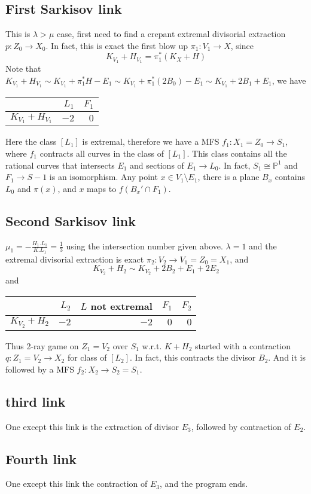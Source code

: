 \documentclass{article}
\begin{document}
\subsection{First Sarkisov link}
This is $ \lambda > \mu $ case, first need to find a crepant extremal divisorial extraction $ p:Z_0\to X_0 $. In fact, this is exact the first blow up $ \pi_1:V_1\to X $, since
\[ K_{V_1}+H_{V_1}=\pi_1^*(K_X+H) \]
Note that $  K_{V_1}+H_{V_1}\sim K_{V_1}+\pi_1^*H-E_1\sim K_{V_1}+\pi_1^*(2B_0)-E_1\sim K_{V_1}+2B_1+E_1  $, we have
\begin{center}
	\begin{tabular}{c|rr}
		& $ L_1 $ & $ F_1 $ \\
		\hline
		$ K_{V_1}+H_{V_1} $ & $ -2 $ & $ 0 $ \\
	\end{tabular}
\end{center}

Here the class $[L_1]$ is extremal, therefore we have a MFS $ f_1:X_1=Z_0\to S_1$, where $ f_1 $ contracts all curves in the class of $ [L_1] $. This class contains all the rational curves that intersects $ E_1 $ and sections of $ E_1\to L_0 $. In fact, $ S_1\cong\mathbb{P}^1 $ and $ F_1\to S-1 $ is an isomorphism. Any point $ x\in V_1\setminus E_1 $, there is a plane $ B_x $ contains $ L_0 $ and $ \pi(x) $, and $ x $ maps to $ f(B_x'\cap F_1) $.


\subsection{Second Sarkisov link}
$ \mu_1=-\frac{H_1.L_1}{K.L_1}=\frac{1}{3} $ using the intersection number given above. $ \lambda=1 $ and the extremal divisorial extraction is exact $ \pi_2:V_2\to V_1=Z_0=X_1 $, and
\[ K_{V_2}+H_2\sim K_{V_2}+2B_2+E_1+2E_2 \]
and
\begin{center}
	\begin{tabular}{c|rrrr}
		& $ L_2 $ & $ L $ not extremal &$ F_1 $ &$ F_2 $ \\
		\hline
		$ K_{V_2}+H_{2} $ & $ -2 $ &$-2$&  $ 0 $&$ 0 $ \\
	\end{tabular}
\end{center}
Thus 2-ray game on $ Z_1=V_2 $ over $S_1$ w.r.t. $K+H_2$ started with a contraction $ q:Z_1=V_2\to X_2 $ for class of $[L_2]$. In fact, this contracts the divisor $B_2$. And it is followed by a MFS $ f_2:X_2\to S_2=S_1$.
\subsection{third link}
One except this link is the extraction of divisor $ E_3 $, followed by contraction of $ E_2 $.
\subsection{Fourth link}
One except this link the contraction of $ E_3 $, and the program ends.
\end{document}

